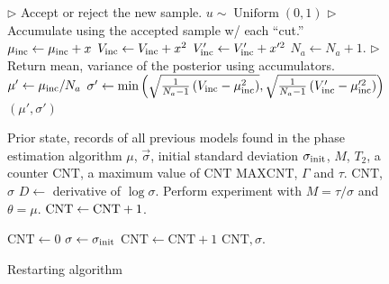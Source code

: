 \documentclass[aps,pra,amsmath,twocolumn,amssymb,superscriptaddress]{revtex4-1}
\newcommand{\linecomment}[1]{\State \(\triangleright\) {\footnotesize #1} \normalsize}
\newcommand{\CRej}{\text{RejF }}
\begin{document}
{\begin{figure}[h]
\begin{algorithm}[H]
\begin{algorithmic}
            \linecomment{Accept or reject the new sample.}
            \State $u \sim \operatorname{Uniform}(0, 1)$
                \linecomment{Accumulate using the accepted sample w/ each ``cut.''}
                \State $\mu_{\rm inc} \gets \mu_{\rm inc}+ x$
                \State $V_{\rm inc} \gets V_{\rm inc}+ x^2$
                \State $V_{\rm inc}' \gets V_{\rm inc}'+ x'^2$
                \State $N_a \gets N_a +1$.
            \EndIf
        \EndFor
        \linecomment{Return mean, variance of the posterior using accumulators.}
        \State $\mu'\gets \mu_{\rm inc}/N_a $
        \State $\sigma' \gets \min\left(\sqrt{\frac{1}{N_a -1}\left(V_{\rm inc} - \mu_{\rm inc}^2 \right)},\sqrt{\frac{1}{N_a -1}\left(V_{\rm inc}' - \mu_{\rm inc}'^2 \right)}\right)$%
        \State\Return $(\mu',\sigma')$

    \end{algorithmic}
\end{algorithm}
\end{figure}





\begin{figure}
\begin{algorithm}[H]
    \caption{Restarting algorithm}
    \label{alg:restart}
\begin{algorithmic}
        \Require Prior \CRej state, records of all previous models found in the phase estimation algorithm $\mu$, $\vec{\sigma}$, initial standard deviation $\sigma_{\rm init}$, $M$, $T_2$, a counter $\text{CNT}$, a maximum value of $\text{CNT}$ $\text{MAXCNT}$, $\Gamma$ and $\tau$.
	\Ensure $\text{CNT}$, $\sigma$ 
	\State $D \gets$ derivative of $\log{\sigma}$.
		\State Perform experiment with $M=\tau/\sigma$ and $\theta=\mu$.
\State ${\rm CNT} \gets {\rm CNT}+1$.
			
\Else{}

		

\State $\text{CNT}\gets 0$
	\State $\sigma \gets \sigma_{\rm init}$
\EndIf
\Else{}
	\State $\text{CNT}\gets \text{CNT}+1$
	\EndIf
\State \Return $\text{CNT},\sigma$.
        \EndFunction
    \end{algorithmic}
\end{algorithm}
\end{figure}


}
\end{document}
